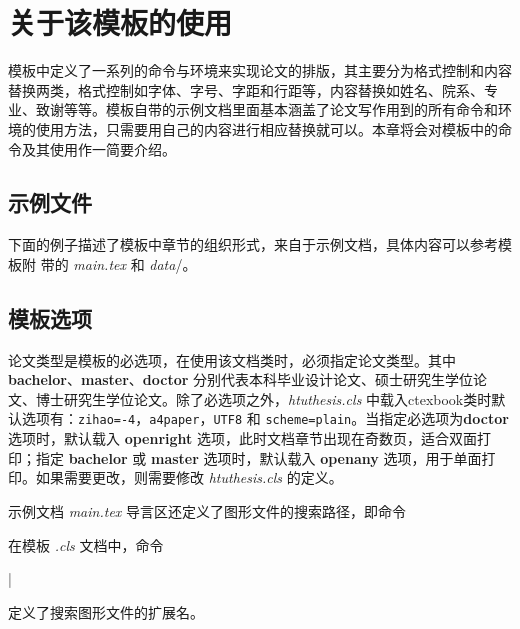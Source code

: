 \chapter{关于该模板的使用}
\label{cha:usage}

模板中定义了一系列的命令与环境来实现论文的排版，其主要分为格式控制和内容替换两类，格式控制如字体、字号、字距和行距等，内容替换如姓名、院系、专业、致谢等等。模板自带的示例文档里面基本涵盖了论文写作用到的所有命令和环境的使用方法，只需要用自己的内容进行相应替换就可以。本章将会对模板中的命令及其使用作一简要介绍。

\section{\htuthesis{} 示例文件}

下面的例子描述了模板中章节的组织形式，来自于示例文档，具体内容可以参考模板附
带的 \emph{main.tex} 和 \emph{data}\//。



\section{模板选项}
\label{sec:option}


论文类型是模板的必选项，在使用该文档类时，必须指定论文类型。其中 \textbf{bachelor}、\textbf{master}、\textbf{doctor} 分别代表本科毕业设计论文、硕士研究生学位论文、博士研究生学位论文。除了必选项之外，\emph{htuthesis.cls} 中载入ctexbook类时默认选项有：\texttt{zihao=-4}，\texttt{a4paper}，\texttt{UTF8} 和 \texttt{scheme=plain}。当指定必选项为\textbf{doctor} 选项时，默认载入 \textbf{openright} 选项，此时文档章节出现在奇数页，适合双面打印；指定 \textbf{bachelor} 或 \textbf{master} 选项时，默认载入 \textbf{openany} 选项，用于单面打印。如果需要更改，则需要修改 \emph{htuthesis.cls} 的定义。

示例文档 \emph{main.tex} 导言区还定义了图形文件的搜索路径，即命令
\begin{latex}
\graphicspath{}
\end{latex}
在模板 \emph{.cls} 文档中，命令
\begin{latex}
|
\end{latex}
定义了搜索图形文件的扩展名。

